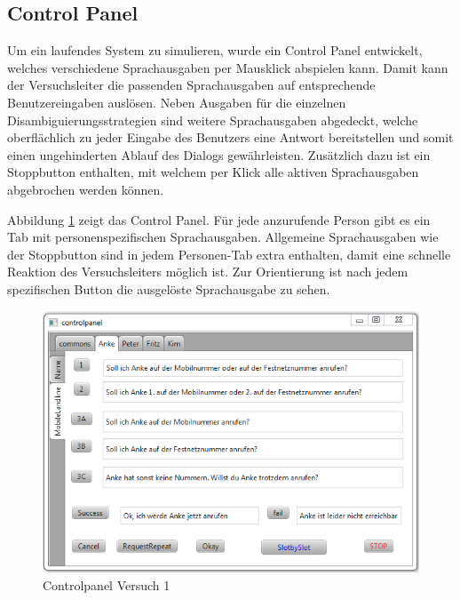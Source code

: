 \documentclass[12pt,a4paper]{scrartcl}
\begin{document}
\subsection{Control Panel}
\label{ControlPanel}
Um ein laufendes System zu simulieren, wurde ein Control Panel entwickelt, welches verschiedene Sprachausgaben per Mausklick abspielen kann. Damit kann der Versuchsleiter die passenden Sprachausgaben auf entsprechende Benutzereingaben auslösen. Neben Ausgaben für die einzelnen Disambiguierungsstrategien sind weitere Sprachausgaben abgedeckt, welche oberflächlich zu jeder Eingabe des Benutzers eine Antwort bereitstellen und somit einen ungehinderten Ablauf des Dialogs gewährleisten. Zusätzlich dazu ist ein Stoppbutton enthalten, mit welchem per Klick alle aktiven Sprachausgaben abgebrochen werden können. 

Abbildung \ref{cp1} zeigt das Control Panel. Für jede anzurufende Person gibt es ein Tab mit personenspezifischen Sprachausgaben. Allgemeine Sprachausgaben wie der Stoppbutton sind in jedem Personen-Tab extra enthalten, damit eine schnelle Reaktion des Versuchsleiters möglich ist. Zur Orientierung ist nach jedem spezifischen Button die ausgelöste Sprachausgabe zu sehen. 
\begin{figure}[H]
\includegraphics[width=13cm]{controlpanel.png}
\caption{Controlpanel Versuch 1}
\label{cp1}
\end{figure}
\end{document}
